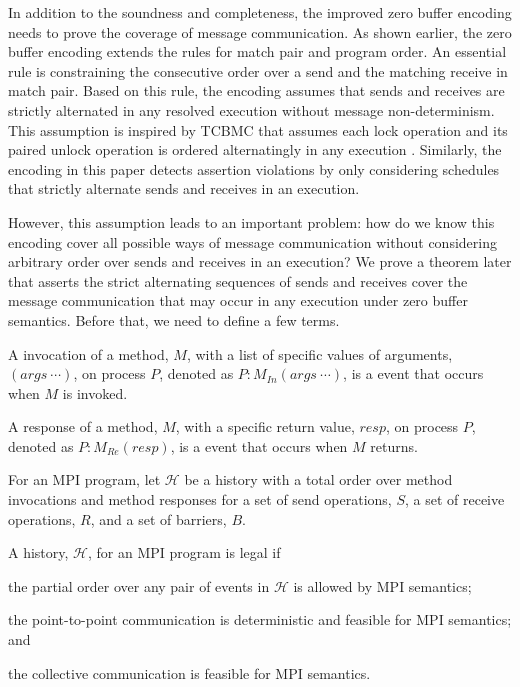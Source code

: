In addition to the soundness and completeness, the improved zero buffer encoding needs to prove the coverage of message communication. As shown earlier, the zero buffer encoding extends the rules for match pair and program order. An essential rule is constraining the consecutive order over a send and the matching receive in match pair. Based on this rule, the encoding assumes that sends and receives are strictly alternated in any resolved execution without message non-determinism. This assumption is inspired by TCBMC that assumes each lock operation and its paired unlock operation is ordered alternatingly in any execution \cite{DBLP:conf/cav/RabinovitzG05}. Similarly, the encoding in this paper detects assertion violations by only considering schedules that strictly alternate sends and receives in an execution. 

However, this assumption leads to an important problem: how do we know this encoding cover all possible ways of message communication without considering arbitrary order over sends and receives in an execution? We prove a theorem later that asserts the strict alternating sequences of sends and receives cover the message communication that may occur in any execution under zero buffer semantics. Before that, we need to define a few terms.

\begin{definition}
A invocation of a method, $M$, with a list of specific values of arguments, $(args\ \cdots)$, on process $P$, denoted as $P:M_\mathit{In}(args\ \cdots)$, is a event that occurs when $M$ is invoked. 
\end{definition}

\begin{definition}
A response of a method, $M$, with a specific return value, $resp$, on process $P$, denoted as $P:M_\mathit{Re}(resp)$, is a event that occurs when $M$ returns. 
\end{definition}

\begin{definition}[History]\label{def:history}
For an MPI program, let $\mathcal{H}$ be a history with a total order over method invocations and method responses for a set of send operations, $S$, a set of receive operations, $R$, and a set of barriers, $B$.
\end{definition}

\begin{definition}\label{def:legal}
A history, $\mathcal{H}$, for an MPI program is legal if
\begin{compactenum}
\item the partial order over any pair of events in $\mathcal{H}$ is allowed by MPI semantics; 
\item the point-to-point communication is deterministic and feasible for MPI semantics; and
\item the collective communication is feasible for MPI semantics.
\end{compactenum}
\end{definition}

